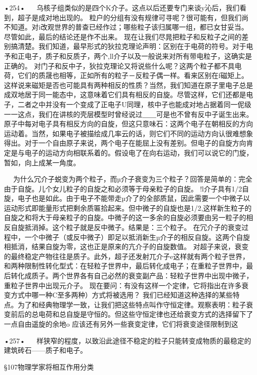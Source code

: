 •254•
  
乌核子组类似的是四个K介子。这点以后还要专门来谈y沁后，我们看到，超子是成对地出现的。
粒户的分组有没有规律可寻呢？很可能有，但我们尚不知道。对i改观世界的普查已经作过；哪些粒子该归属哪一组，都已女甘妥当。尽管如此，最后的结论还是作不出来。
现在让我们尽晁把粒子和反粒子之间的差别搞清楚。我们知道，最早形式的狄拉克理论声明：区别在于电荷的符号。对于电予和正电子，质子和反质子，两个,ll介子以及一般说来对所有带电粒子，这确实是正确的。
对门子和反中子，狄拉克理论又将说些什么呢？这两个粒子都不具电荷，它们的质晟也相等，正如所有的粒子－反粒子偶一样。看来区别在f磁矩上。
这样说来磁矩是否也可能具有两种相反的性质？当然，我们知道在原子里电子总是成双地居于同一能态中，这意味着它们具有相反的自旋。尽管这样，它们还都是电子，二者之中并没有一个变成了正电子U同理，核中子也能成对地占据着同一伲级一一这点，我们在讲核的壳层模型时曾经说过＿＿可是也不曾有反中子诞生出来。
原子中每对电子具有相反方向的自旋，但这只意味石：这两个电子在朝相反的方向运动着。当然，如果电子被描绘成几率云的话，则它们不同的运动方向认很难想象得出。对于一个自由原子来说，两个电子在能屈上没有差别。但电子的自旋方向肯定是与电子的运动方向相联系着的。假设电了在向右运动，我们可以说它的门旋，暂如，向上成某一角度。

  
为什么冗介子蜕变为两个粒子，而µ介子衰变为三个粒子？回答是简单的：完全由于自旋。儿个女儿粒子的自旋之和必须等于母亲粒子的自旋。
!l介子具有1/2自旋，电子也是如此。由于电子不能带走µ介了的全部质鼠，因此需要一个中微子以运动形式即能量形式把剩余质匾拾起来。但中微子的自旋也是1/2,这样新生粒子的自旋之和将大于母亲粒子的自旋。中微子的这一多余的自旋必须要由另一粒子的相反自旋抵消掉。这个粒子就是反中微子。结果是：三个粒子。
在冗介子的衰变过程中，一个中微子（或反中微子）即足以抵消新生µ介子的相反自旋。这两个自旋相抵消，结果自旋为零，这也正是原来的亢介子的自旋数值。
对超子来说，衰变的最终稳定产物往往是质子。此外，超子还发射兀介子e这样就有两个粒子世界，和两种限制性转化型式：在轻粒子世界中，最后转化成电子；在重粒子世界中，最后转化成质子。两个世界各有自己必然的衰变副产品：轻粒子世界中出现中微子，重粒子世界中出现元介子。
现在要问：有没有这样一个定律，它将指出在许多衰变方式中哪一种C至多两种）方式将被选用？
我们已经知道这种选择的某些特点。为了和经典物理学一致，让我们把这些特点叫作守恒定律。观察表明：粒子衰变前后的总电荷和总自旋是守恒的。但这些守恒定律也还给衰变方式的选择留下了一点自由遥旋的余地o
应该还有另外一些衰变定律，它们将衰变途径限制到这

•257•
  
样狭窄的程度，以致沿此途径不稳定的粒子只能转变成物质的最稳定的建筑砖石——质子和电子。

§107物理学家将相互作用分类

